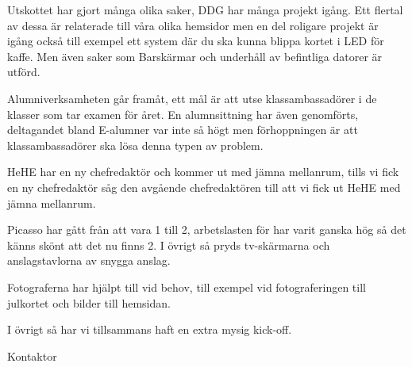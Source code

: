 \documentclass[../_main/handlingar.tex]{subfiles}
\begin{document}
Utskottet har gjort många olika saker, DDG har många projekt igång. Ett flertal av dessa är relaterade till våra olika hemsidor men en del roligare projekt är igång också till exempel ett system där du ska kunna blippa kortet i LED för kaffe. Men även saker som Barskärmar och underhåll av befintliga datorer är utförd.

Alumniverksamheten går framåt, ett mål är att utse klassambassadörer i de klasser som tar examen för året. En alumnsittning har även genomförts, deltagandet bland E-alumner var inte så högt men förhoppningen är att klassambassadörer ska lösa denna typen av problem.

HeHE har en ny chefredaktör och kommer ut med jämna mellanrum, tills vi fick en ny chefredaktör såg den avgående chefredaktören till att vi fick ut HeHE med jämna mellanrum.

Picasso har gått från att vara 1 till 2, arbetslasten för har varit ganska hög så det känns skönt att det nu finns 2. I övrigt så pryds tv-skärmarna och anslagstavlorna av snygga anslag.

Fotograferna har hjälpt till vid behov, till exempel vid fotograferingen till julkortet och bilder till hemsidan.

I övrigt så har vi tillsammans haft en extra mysig kick-off.
\begin{signatures}{1}
    \mvh
    \signature{Axel Voss}{Kontaktor}
\end{signatures}
\end{document}

